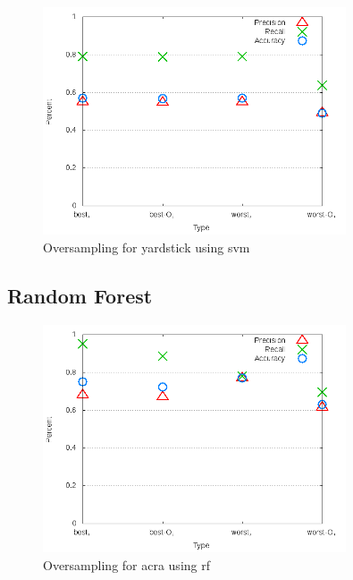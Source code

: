 \begin{figure}[!t]
\centering
\includegraphics[width=0.8\textwidth]{images/svm/test_4/yardstick_sample_range.png}
\caption{Oversampling for yardstick using \gls{svm}}
\label{fig:test_4_yardstick_svm}
\end{figure}


\subsection{Random Forest}
\label{app_sub:experiment_3_rf}
\clearpage

\begin{figure}
\centering
\includegraphics[width=0.8\textwidth]{images/rf/test_4/acra_sample_range.png}
\caption{Oversampling for acra using \gls{rf}}
\label{fig:test_4_acra_rf}
\end{figure}

